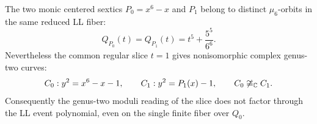 \begin{theorem}
\label{thm:explicit-ll-igusa-twin}
The two monic centered sextics $P_0=x^6-x$ and $P_1$ belong to distinct
$\mu_6$-orbits in the same reduced LL fiber:
\begin{equation}
 Q_{P_0}(t)=Q_{P_1}(t)=t^5+\frac{5^5}{6^6}.
 \label{eq:explicit-ll-twin-same-event-polynomial}
\end{equation}
Nevertheless the common regular slice $t=1$ gives nonisomorphic complex
genus-two curves:
\begin{equation}
 C_0:y^2=x^6-x-1,
 \qquad
 C_1:y^2=P_1(x)-1,
 \qquad
 C_0\not\cong_{\mathbb{C}}C_1.
 \label{eq:explicit-ll-twin-curves}
\end{equation}
Consequently the genus-two moduli reading of the slice does not factor through
the LL event polynomial, even on the single finite fiber over $Q_0$.
\end{theorem}

